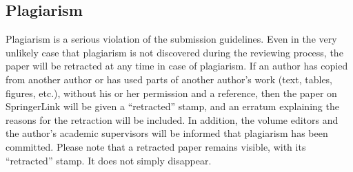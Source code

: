 \documentclass[runningheads]{llncs}
\begin{document}
	\subsection{Plagiarism}
	Plagiarism is a serious violation of the submission guidelines.
	Even in the very unlikely case that plagiarism is not discovered during the reviewing process, the paper will be retracted at any time in case of plagiarism.
	If an author has copied from another author or has used parts of another author's work (text, tables, figures, etc.), without his or her permission and a reference, then the paper on SpringerLink will be given a ``retracted'' stamp, and an erratum explaining the reasons for the retraction will be included.
	In addition, the volume editors and the author's academic supervisors will be informed that plagiarism has been committed.
	Please note that a retracted paper remains visible, with its ``retracted'' stamp.
	It does not simply disappear.

	
	
\end{document}
